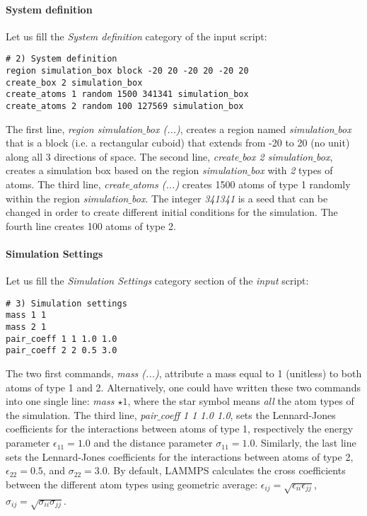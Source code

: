 \paragraph{System definition}
Let us fill the \textit{System definition} category of the input script:
{\small \begin{verbatim}
# 2) System definition
region simulation_box block -20 20 -20 20 -20 20
create_box 2 simulation_box
create_atoms 1 random 1500 341341 simulation_box
create_atoms 2 random 100 127569 simulation_box
\end{verbatim}}
\noindent The first line, \textit{region simulation$\_$box (...)}, creates a region named \textit{simulation$\_$box} that is a block (i.e. a rectangular cuboid) that extends from -20 to 20 (no unit) along all 3 directions of space. The second line, \textit{create$\_$box 2 simulation$\_$box}, creates a simulation box based on the region \textit{simulation$\_$box} with \textit{2} types of atoms. The third line, \textit{create$\_$atoms (...)} creates 1500 atoms of type 1 randomly within the region \textit{simulation$\_$box}. The integer \textit{341341} is a seed that can be changed in order to create different
initial conditions for the simulation. The fourth line creates 100 atoms of type 2.

\paragraph{Simulation Settings}
Let us fill the \textit{Simulation Settings} category section of the \textit{input} script:
{\small \begin{verbatim}
# 3) Simulation settings
mass 1 1
mass 2 1
pair_coeff 1 1 1.0 1.0
pair_coeff 2 2 0.5 3.0
\end{verbatim}}
The two first commands, \textit{mass (...)}, attribute a mass equal to 1 (unitless) to both atoms of type 1 and 2. Alternatively, one could have written these two commands into one single line: \textit{mass $\star 1$}, where the star symbol means \textit{all} the atom types of the simulation.  The third line, \textit{pair$\_$coeff 1 1 1.0 1.0}, sets the Lennard-Jones coefficients for the interactions between atoms of type 1, respectively the energy parameter $\epsilon_{11} = 1.0$ and the distance parameter $\sigma_{11} = 1.0$. Similarly, the last line sets the Lennard-Jones coefficients for the interactions between atoms of type 2, $\epsilon_{22} = 0.5$, and $\sigma_{22} = 3.0$. By default, LAMMPS calculates the cross coefficients between the different atom types using geometric average: $\epsilon_{ij} = \sqrt{\epsilon_{ii} \epsilon_{jj}}$, $\sigma_{ij} = \sqrt{\sigma_{ii} \sigma_{jj}}$. 


